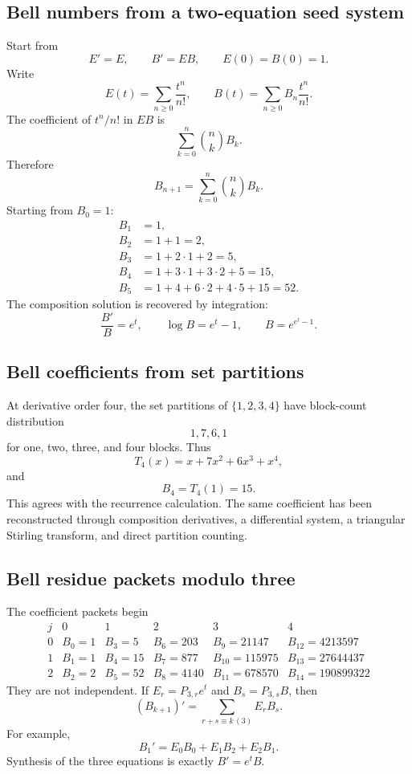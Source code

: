 \documentclass[11pt]{article}
\theoremstyle{definition}\newtheorem{definition}[theorem]{Definition}\newtheorem{example}[theorem]{Example}\newtheorem{construction}[theorem]{Construction}\newtheorem{algorithm}[theorem]{Algorithm}\newtheorem{conjecture}[theorem]{Conjecture}\newtheorem{problem}[theorem]{Problem}
\theoremstyle{remark}\newtheorem{remark}[theorem]{Remark}\newtheorem{boundary}[theorem]{Boundary}\newtheorem{certificate}[theorem]{Computational Certificate}\newtheorem{classical}[theorem]{Classical Input}\newtheorem{principle}[theorem]{Structural Principle}
\begin{document}
\subsection{Bell numbers from a two-equation seed system}
Start from
\[
 E'=E,
 \qquad
 B'=EB,
 \qquad
 E(0)=B(0)=1.
\]
Write
\[
 E(t)=\sum_{n\geq0}\frac{t^n}{n!},
 \qquad
 B(t)=\sum_{n\geq0}B_n\frac{t^n}{n!}.
\]
The coefficient of $t^n/n!$ in $EB$ is
\[
 \sum_{k=0}^{n}\binom nk B_k.
\]
Therefore
\[
 B_{n+1}=\sum_{k=0}^{n}\binom nk B_k.
\]
Starting from $B_0=1$:
\[
\begin{aligned}
B_1&=1,\\
B_2&=1+1=2,\\
B_3&=1+2\cdot1+2=5,\\
B_4&=1+3\cdot1+3\cdot2+5=15,\\
B_5&=1+4+6\cdot2+4\cdot5+15=52.
\end{aligned}
\]
The composition solution is recovered by integration:
\[
 \frac{B'}B=e^t,
 \qquad
 \log B=e^t-1,
 \qquad
 B=e^{e^t-1}.
\]

\subsection{Bell coefficients from set partitions}
At derivative order four, the set partitions of $\{1,2,3,4\}$ have block-count distribution
\[
 1,7,6,1
\]
for one, two, three, and four blocks.  Thus
\[
 T_4(x)=x+7x^2+6x^3+x^4,
\]
and
\[
 B_4=T_4(1)=15.
\]
This agrees with the recurrence calculation.  The same coefficient has been reconstructed through composition derivatives, a differential system, a triangular Stirling transform, and direct partition counting.

\subsection{Bell residue packets modulo three}
The coefficient packets begin
\[
\begin{array}{c|rrrrr}
 j&0&1&2&3&4\\
\hline
0&B_0=1&B_3=5&B_6=203&B_9=21147&B_{12}=4213597\\
1&B_1=1&B_4=15&B_7=877&B_{10}=115975&B_{13}=27644437\\
2&B_2=2&B_5=52&B_8=4140&B_{11}=678570&B_{14}=190899322
\end{array}
\]
They are not independent.  If $E_r=P_{3,r}e^t$ and $B_s=P_{3,s}B$, then
\[
 (B_{k+1})'=\sum_{r+s\equiv k\,(3)}E_rB_s.
\]
For example,
\[
 B_1'=E_0B_0+E_1B_2+E_2B_1.
\]
Synthesis of the three equations is exactly $B'=e^tB$.
\end{document}
